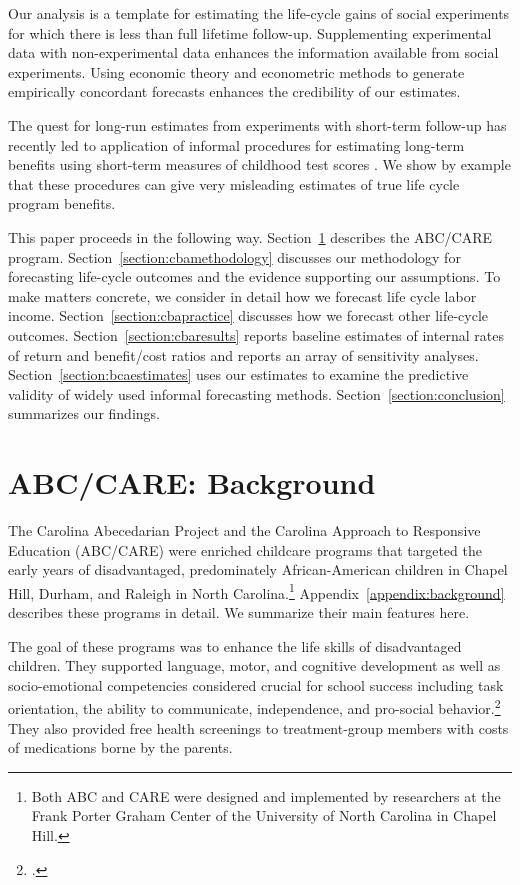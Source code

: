 Our analysis is a template for estimating the life-cycle gains of social experiments for which there is less than full lifetime follow-up. Supplementing experimental data with non-experimental data enhances the information available from social experiments. Using economic theory and econometric methods to generate empirically concordant forecasts enhances the credibility of our estimates.

The quest for long-run estimates from experiments with short-term follow-up has recently led to application of informal procedures for estimating long-term benefits using short-term measures of childhood test scores \citep[e.g.][]{Chetty_Friedman_etal_2011_QJoE,Kline_Walters_2016_QJE}. We show by example that these procedures can give very misleading estimates of true life cycle program benefits.

This paper proceeds in the following way. Section~\ref{section:background} describes the ABC/CARE program. Section~\ref{section:cbamethodology} discusses our methodology for forecasting life-cycle outcomes and the evidence supporting our assumptions. To make matters concrete, we consider in detail how we forecast life cycle labor income. Section~\ref{section:cbapractice} discusses how we forecast other life-cycle outcomes. Section~\ref{section:cbaresults} reports baseline estimates of internal rates of return and benefit/cost ratios and reports an array of sensitivity analyses. Section~\ref{section:bcaestimates} uses our estimates to examine the predictive validity of widely used informal forecasting methods. Section~\ref{section:conclusion} summarizes our findings.

\section{ABC/CARE: Background} \label{section:background}

\noindent The Carolina Abecedarian Project and the Carolina Approach to Responsive Education (ABC/CARE) were enriched childcare programs that targeted the early years of disadvantaged, predominately African-American children in Chapel Hill, Durham, and Raleigh in North Carolina.\footnote{Both ABC and CARE were designed and implemented by researchers at the Frank Porter Graham Center of the University of North Carolina in Chapel Hill.} Appendix~\ref{appendix:background} describes these programs in detail. We summarize their main features here.

The goal of these programs was to enhance the life skills of disadvantaged children. They supported language, motor, and cognitive development as well as socio-emotional competencies considered crucial for school success including task orientation, the ability to communicate, independence, and pro-social behavior.\footnote{\citet{Sparling_1974_Synth_Edu_Infant_SPEECH, Ramey_Collier_etal_1976_CarolinaAbecedarianProject, Ramey_etal_1985_Project-CARE_TiECSE, Wasik_Ramey_etal_1990_CD, Ramey-etal_2012-ABC}.} They also provided free health screenings to treatment-group members with costs of medications borne by the parents.

